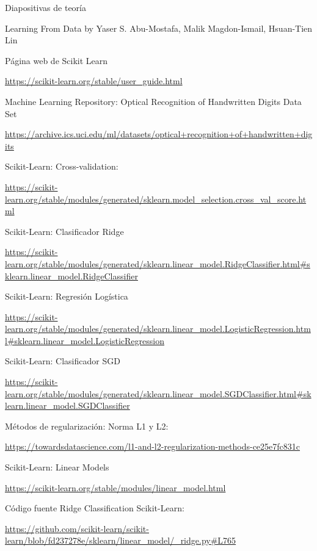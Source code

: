 \documentclass[12pt, spanish]{article}
\begin{document}
\begin{thebibliography}{9}


Diapositivas de teoría

Learning From Data by Yaser S. Abu-Mostafa, Malik Magdon-Ismail, Hsuan-Tien Lin

Página web de Scikit Learn

\url{https://scikit-learn.org/stable/user_guide.html}


Machine Learning Repository: Optical Recognition of Handwritten Digits Data Set 

\url{https://archive.ics.uci.edu/ml/datasets/optical+recognition+of+handwritten+digits}


Scikit-Learn: Cross-validation:

\url{https://scikit-learn.org/stable/modules/generated/sklearn.model_selection.cross_val_score.html}



Scikit-Learn: Clasificador Ridge

\url{https://scikit-learn.org/stable/modules/generated/sklearn.linear_model.RidgeClassifier.html#sklearn.linear_model.RidgeClassifier}

Scikit-Learn: Regresión Logística

\url{https://scikit-learn.org/stable/modules/generated/sklearn.linear_model.LogisticRegression.html#sklearn.linear_model.LogisticRegression}

Scikit-Learn: Clasificador SGD 

\url{https://scikit-learn.org/stable/modules/generated/sklearn.linear_model.SGDClassifier.html#sklearn.linear_model.SGDClassifier}


Métodos de regularización: Norma L1 y L2:

\url{https://towardsdatascience.com/l1-and-l2-regularization-methods-ce25e7fc831c}


Scikit-Learn: Linear Models

\url{https://scikit-learn.org/stable/modules/linear_model.html}


Código fuente Ridge Classification Scikit-Learn:

\url{https://github.com/scikit-learn/scikit-learn/blob/fd237278e/sklearn/linear_model/_ridge.py#L765}




\end{thebibliography}
\end{document}
